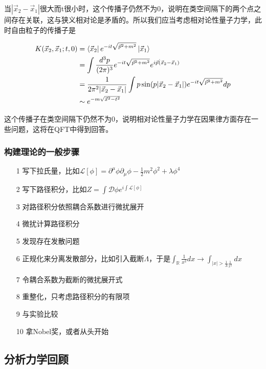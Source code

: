 当$|\vec{x}_2-\vec{x}_1|$很大而t很小时，这个传播子仍然不为0，说明在类空间隔下的两个点之间存在关联，这与狭义相对论是矛盾的。所以我们应当考虑相对论性量子力学，此时自由粒子的传播子是

\begin{equation}
    \begin{split}
        K(\vec{x}_2,\vec{x}_1; t, 0) &= \bra{\vec{x}_2}e^{-it\sqrt{\vec{p}^2+m^2}}\ket{\vec{x}_1} \\
            &= \int \frac{d^3p}{(2\pi)^3} e^{-it\sqrt{\vec{p}^2+m^2}} e^{i\vec{p}\dot(\vec{x}_2-\vec{x}_1)} \\
            &= \frac{1}{2\pi^2|\vec{x}_2-\vec{x}_1|} \int p\sin(p|\vec{x}_2-\vec{x}_1|)e^{-it\sqrt{\vec{p}^2+m^2}}dp \\
            &\sim e^{-m\sqrt{\vec{x}^2-t^2}}
    \end{split}
\end{equation}

这个传播子在类空间隔下仍然不为0，说明相对论性量子力学在因果律方面存在一些问题，这将在QFT中得到回答。



\subsubsection{构建理论的一般步骤}

\begin{itemize}
    \item[1] 写下拉氏量，比如$\mathcal{L}[\phi]=\partial^\mu\phi\partial_\mu\phi-\frac{1}{2}m^2\phi^2+\lambda\phi^4$
    \item[2] 写下路径积分，比如$Z=\int\mathcal{D}\phi e^{i\int\mathcal{L}[\phi]}$
    \item[3] 对路径积分依照耦合系数进行微扰展开
    \item[4] 微扰计算路径积分
    \item[5] 发现存在发散问题
    \item[6] 正规化来分离发散部分，比如引入截断$\Lambda$，于是$\int_\mathbb{R}\frac{1}{x^2}dx \to \int_{|x|>\frac{1}{\Lambda}\frac{1}{x^2}}dx$
    \item[7] 令耦合系数为截断的微扰展开式
    \item[8] 重整化，只考虑路径积分的有限项
    \item[9] 与实验比较
    \item[10] 拿Nobel奖，或者从头开始   
\end{itemize}



\subsection{分析力学回顾}

